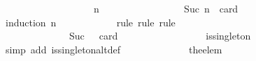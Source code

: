 \begin{isabellebody}
\ \ \ \ \ \ \isamarkupfalse%
\ {\isacharminus}\ \isanewline
\ \ \ \ \ \ \ \ \isamarkupfalse%
\ n\isanewline
\ \ \ \ \ \ \ \ \isamarkupfalse%
\ {\isachardoublequoteopen}{\isasymforall}{\isasymsigma}{\isasymin}{\isasymSigma}{\isachardot}\ {\isasymforall}{\isasymsigma}{\isacharprime}{\isasymin}{\isasymSigma}{\isachardot}\ {\isasymnot}\ {\isasymsigma}\ {\isasymsubseteq}\ {\isasymsigma}{\isacharprime}\ {\isasymand}\ Suc\ n\ {\isacharequal}\ card\ {\isacharparenleft}{\isasymsigma}\ {\isacharminus}\ {\isasymsigma}{\isacharprime}{\isacharparenright}\ {\isasymlongrightarrow}\ {\isasymsigma}\ {\isasymunion}\ {\isasymsigma}{\isacharprime}\ {\isasymin}\ {\isasymSigma}{\isachardoublequoteclose}\isanewline
\ \ \ \ \ \ \ \ \ \ \isamarkupfalse%
\ {\isacharparenleft}induction\ n{\isacharparenright}\isanewline
\ \ \ \ \ \ \ \ \ \ \isamarkupfalse%
\ {\isacharparenleft}rule{\isacharcomma}\ rule{\isacharcomma}\ rule{\isacharparenright}\isanewline
\ \ \ \ \ \ \ \ \isamarkupfalse%
\ {\isacharminus}\ \isanewline
\ \ \ \ \ \ \ \ \ \ \isamarkupfalse%
\ {\isasymsigma}\ {\isasymsigma}{\isacharprime}\isanewline
\ \ \ \ \ \ \ \ \ \ \isamarkupfalse%
\ {\isachardoublequoteopen}{\isasymsigma}\ {\isasymin}\ {\isasymSigma}{\isachardoublequoteclose}\ \ {\isachardoublequoteopen}{\isasymsigma}{\isacharprime}\ {\isasymin}\ {\isasymSigma}{\isachardoublequoteclose}\ \ {\isachardoublequoteopen}{\isasymnot}\ {\isasymsigma}\ {\isasymsubseteq}\ {\isasymsigma}{\isacharprime}\ {\isasymand}\ Suc\ {}\ {\isacharequal}\ card\ {\isacharparenleft}{\isasymsigma}\ {\isacharminus}\ {\isasymsigma}{\isacharprime}{\isacharparenright}{\isachardoublequoteclose}\ \isanewline
\ \ \ \ \ \ \ \ \ \ \isamarkupfalse%
\ \isamarkupfalse%
\ {\isachardoublequoteopen}is{\isacharunderscore}singleton\ {\isacharparenleft}{\isasymsigma}\ {\isacharminus}\ {\isasymsigma}{\isacharprime}{\isacharparenright}{\isachardoublequoteclose}\isanewline
\ \ \ \ \ \ \ \ \ \ \ \ \isamarkupfalse%
\ {\isacharparenleft}simp\ add{\isacharcolon}\ is{\isacharunderscore}singleton{\isacharunderscore}altdef{\isacharparenright}\isanewline
\ \ \ \ \ \ \ \ \ \ \isamarkupfalse%
\ \isamarkupfalse%
\ {\isachardoublequoteopen}{\isacharbraceleft}the{\isacharunderscore}elem\ {\isacharparenleft}{\isasymsigma}\ {\isacharminus}\ {\isasymsigma}{\isacharprime}{\isacharparenright}{\isacharbraceright}\ {\isasymunion}\ {\isasymsigma}{\isacharprime}\ {\isasymin}\ {\isasymSigma}{\isachardoublequoteclose}\isanewline

\end{isabellebody}
